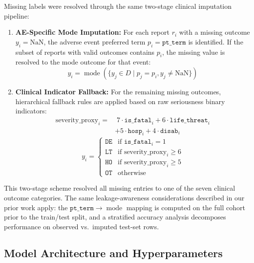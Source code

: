 \documentclass[10pt,twocolumn]{article}
\begin{document}
Missing labels were resolved through the same two-stage clinical imputation pipeline:
\begin{enumerate}[leftmargin=*]
\item \textbf{AE-Specific Mode Imputation:} For each report $r_i$ with a missing outcome $y_i = \text{NaN}$, the adverse event preferred term $p_i = \texttt{pt\_term}$ is identified. If the subset of reports with valid outcomes contains $p_i$, the missing value is resolved to the mode outcome for that event:
\begin{equation}
y_i = \operatorname{mode}\left( \{ y_j \in D \mid p_j = p_i, y_j \neq \text{NaN} \} \right)
\label{eq:aemode}
\end{equation}
\item \textbf{Clinical Indicator Fallback:} For the remaining missing outcomes, hierarchical fallback rules are applied based on raw seriousness binary indicators:
\begin{equation}
\begin{split}
\text{severity\_proxy}_i = & \; 7 \cdot \texttt{is\_fatal}_i + 6 \cdot \texttt{life\_threat}_i \\
& + 5 \cdot \texttt{hosp}_i + 4 \cdot \texttt{disab}_i
\end{split}
\label{eq:sev_proxy}
\end{equation}
\begin{equation}
y_i = 
\begin{cases} 
\texttt{DE} & \text{if } \texttt{is\_fatal}_i = 1 \\
\texttt{LT} & \text{if } \text{severity\_proxy}_i \geq 6 \\
\texttt{HO} & \text{if } \text{severity\_proxy}_i \geq 5 \\
\texttt{OT} & \text{otherwise}
\end{cases}
\label{eq:fallback}
\end{equation}
\end{enumerate}
 
This two-stage scheme resolved all missing entries to one of the seven clinical outcome categories. The same leakage-awareness considerations described in our prior work apply: the $\texttt{pt\_term} \to \operatorname{mode}$ mapping is computed on the full cohort prior to the train/test split, and a stratified accuracy analysis decomposes performance on observed vs.\ imputed test-set rows.
 
\subsection{Model Architecture and Hyperparameters}
\label{sec:dtree}
 
\end{document}

